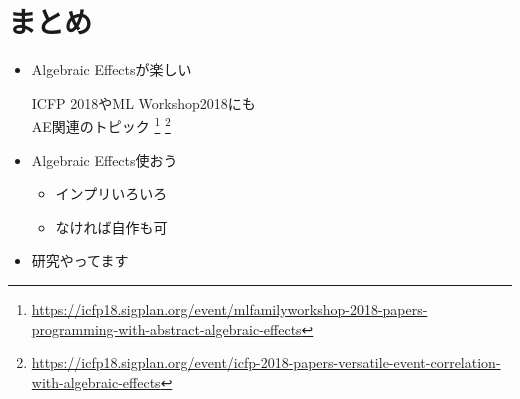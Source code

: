\section{まとめ}
\begin{frame}
    \frametitlesec

    \begin{itemize}
        \item[\coloremoji{🌋}] Algebraic Effectsが楽しい

            ICFP 2018やML Workshop2018にも\\
            AE関連のトピック%
            \footnote{\url{https://icfp18.sigplan.org/event/mlfamilyworkshop-2018-papers-programming-with-abstract-algebraic-effects}}%
            \footnote{\url{https://icfp18.sigplan.org/event/icfp-2018-papers-versatile-event-correlation-with-algebraic-effects}}

        \item[\coloremoji{🉐}] Algebraic Effects使おう

            \begin{itemize}
                \item[\coloremoji{🛠}] インプリいろいろ
                \item[\coloremoji{💪}] なければ自作も可
            \end{itemize}

        \item[\coloremoji{👨‍💻}] 研究やってます
    \end{itemize}
\end{frame}

